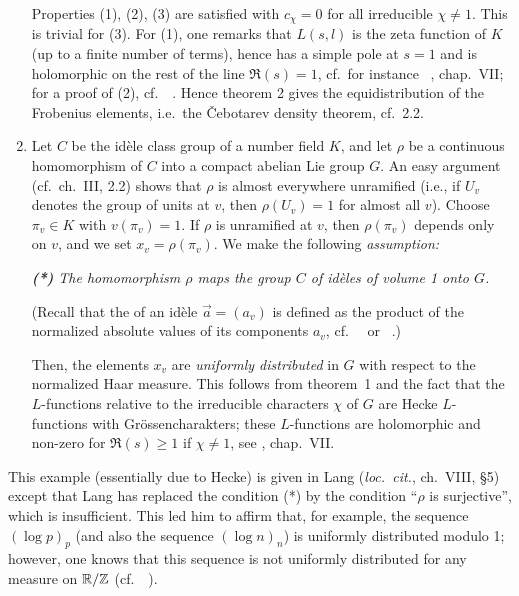 \begin{subappendices}
\begin{ex}
\begin{enumerate}[series=ex_IA3]
	Properties (1), (2), (3) are satisfied with $c_\chi = 0$ for all
	irreducible $\chi \ne 1$. This is trivial for (3). For (1), one remarks that
	$L(s,l)$ is the zeta function of $K$ (up to a finite number of terms),
	hence has a simple pole at $s = 1$ and is holomorphic on the rest of
	\dpage
	the line $\Re(s) = 1$, cf.\ for instance \citeauthor{13}~\cite{13},
	chap.\ VII; for a proof of (2), cf.\ \citeauthor{1}~\cite[121]{1}.
	Hence theorem 2 gives the equidistribution of the Frobenius elements,
	i.e.\ the \v Cebotarev density theorem, cf.\ 2.2.

\item Let $C$ be the idèle class group of a number field $K$, and let $\rho$ be
	a continuous homomorphism of $C$ into a compact abelian Lie group $G$.
	An easy argument (cf.\ ch.\ III, 2.2) shows that $\rho$ is almost
	everywhere unramified (i.e., if $U_v$ denotes the group of units at
	$v$, then $\rho(U_v) = 1$ for almost all $v$). Choose $\pi_v \in K$
	with $v(\pi_v) = 1$. If $\rho$ is unramified at $v$, then $\rho(\pi_v)$
	depends only on $v$, and we set $x_v = \rho(\pi_v)$. We make the
	following \emph{assumption:}
	\begin{displayquote}
		\slshape
		\textbf{(*)}
		The homomorphism $\rho$ maps the group $C$ of idèles of
		volume 1 onto $G$.
	\end{displayquote}
	(Recall that the  of an idèle $\vec a = (a_v)$ is
	defined as the product of the normalized absolute values of its
	components $a_v$, cf.\ \citeauthor{13}~\cite{13} or
	\citeauthor{44}~\cite{44}.)

	Then, the elements $x_v$ are \emph{uniformly distributed} in $G$ with
	respect to the normalized Haar measure. This follows from theorem~1 and
	the fact that the $L$-functions relative to the irreducible characters
	$\chi$ of $G$ are Hecke $L$-functions with Grössencharakters; these
	$L$-functions are holomorphic and non-zero for $\Re(s) \ge 1$ if $\chi
	\ne 1$, see \cite{13}, chap.\ VII.
\end{enumerate}
\end{ex}

\begin{obs}
This example (essentially due to Hecke) is given in Lang
(\emph{loc.\ cit.}, ch.\ VIII, \S 5) except that Lang has replaced the condition
(*) by the condition ``$\rho$ is surjective'', which is insufficient. This
led him to affirm that, for example, the sequence $(\log p)_p$ (and also
the sequence $(\log n)_n$) is uniformly distributed modulo 1; however,
\dpage
one knows that this sequence is not uniformly distributed for any
measure on $\mathbb{R}/\mathbb{Z}$ (cf.\ \citeauthor{22}~\cite[179-180]{22}).
\end{obs}


\end{subappendices}
